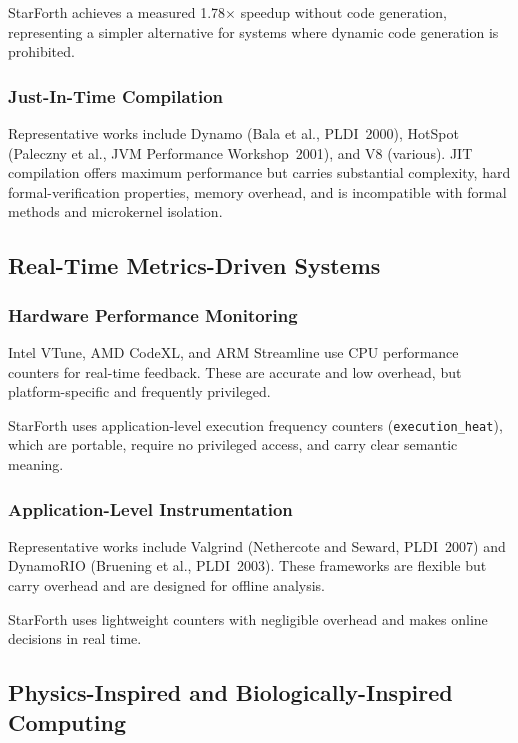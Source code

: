 StarForth achieves a measured 1.78$\times$ speedup without code generation,
representing a simpler alternative for systems where dynamic code generation
is prohibited.

\subsubsection{Just-In-Time Compilation}

Representative works include Dynamo (Bala et al., PLDI~2000), HotSpot
(Paleczny et al., JVM Performance Workshop~2001), and V8 (various). JIT
compilation offers maximum performance but carries substantial complexity,
hard formal-verification properties, memory overhead, and is incompatible
with formal methods and microkernel isolation.

\subsection{Real-Time Metrics-Driven Systems}

\subsubsection{Hardware Performance Monitoring}

Intel VTune, AMD CodeXL, and ARM Streamline use CPU performance counters
for real-time feedback. These are accurate and low overhead, but
platform-specific and frequently privileged.

StarForth uses application-level execution frequency counters
(\texttt{execution\_heat}), which are portable, require no privileged access,
and carry clear semantic meaning.

\subsubsection{Application-Level Instrumentation}

Representative works include Valgrind (Nethercote and Seward, PLDI~2007)
and DynamoRIO (Bruening et al., PLDI~2003). These frameworks are flexible
but carry overhead and are designed for offline analysis.

StarForth uses lightweight counters with negligible overhead and makes
online decisions in real time.

\subsection{Physics-Inspired and Biologically-Inspired Computing}

